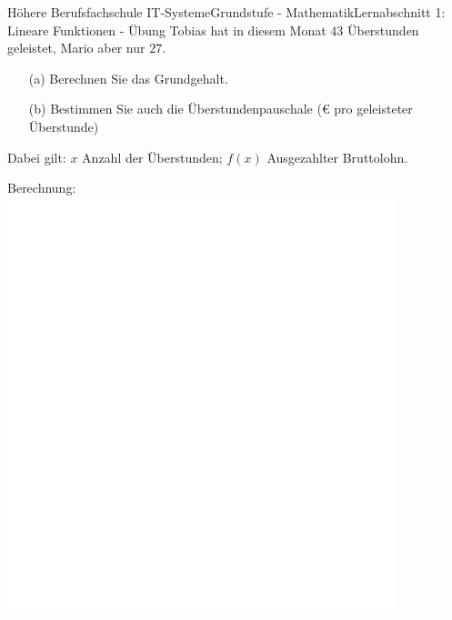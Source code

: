 \documentclass[oneside,openany,headings=optiontotoc,11pt,numbers=noenddot]{scrreprt}
\begin{document}
\begin{worksheet}{Höhere Berufsfachschule IT-Systeme}{Grundstufe - Mathematik}{Lernabschnitt 1: Lineare Funktionen - Übung}
		Tobias hat in diesem Monat \(43\) Überstunden geleistet, Mario aber nur \(27\).\\
		\begin{itemize}
			\item[(a)] Berechnen Sie das Grundgehalt.
			\item[(b)] Bestimmen Sie auch die Überstundenpauschale (\euro{} pro geleisteter Überstunde)
		\end{itemize}
		\small{Dabei gilt: \(x\) Anzahl der Überstunden; \(f(x)\) Ausgezahlter Bruttolohn.}
		\begin{framed}
			\noindent
			\small{\color{codegray}Berechnung:}\\
			\includegraphics[width=0.85\textwidth]{../../empty.jpg}\\
		\end{framed}
	\end{worksheet}
\end{document}
